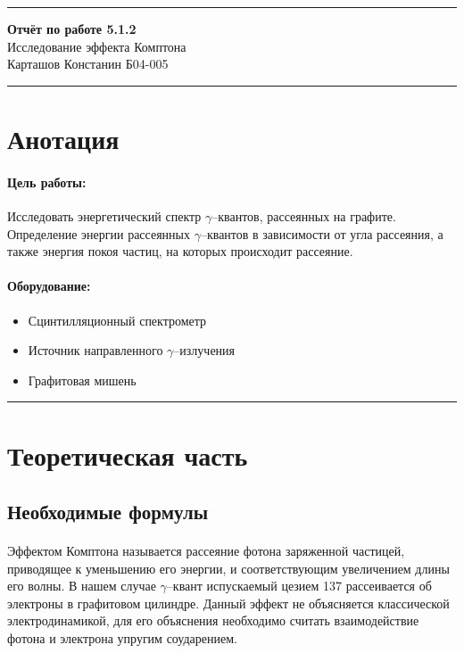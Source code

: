 \documentclass[a4paper,12pt]{article} %
\begin{document}


\hrule 	
\medskip
\begin{raggedright}
{\large \textbf{Отчёт по работе 5.1.2}}
\\
\medskip
{\Large Исследование эффекта Комптона} 
\\
\medskip
{\large Карташов Констанин Б04-005}
\medskip
\hrule
\medskip
\end{raggedright}


\section{Анотация}

\paragraph{Цель работы:} 
Исследовать энергетический спектр $\gamma$--квантов, рассеянных на графите. Определение энергии рассеянных $\gamma$--квантов в зависимости от угла рассеяния, а также энергия покоя частиц, на которых происходит рассеяние.

\paragraph{Оборудование:}
\begin{itemize}
\renewcommand{\labelitemi}{$\triangleright$}
\itemsep0em
\item Сцинтилляционный спектрометр
\item Источник направленного $\gamma$--излучения
\item Графитовая мишень
\end{itemize}


\medskip\hrule\medskip

\section{Теоретическая часть}

\subsection{Необходимые формулы}

\paragraph{} Эффектом Комптона называется рассеяние фотона заряженной частицей, приводящее к уменьшению его энергии, и соответствующим увеличением длины его волны. В нашем случае $\gamma$--квант испускаемый цезием 137 рассеивается об электроны в графитовом цилиндре. Данный эффект не объясняется классической электродинамикой, для его объяснения необходимо считать взаимодействие фотона и электрона упругим соударением.
\end{document}
